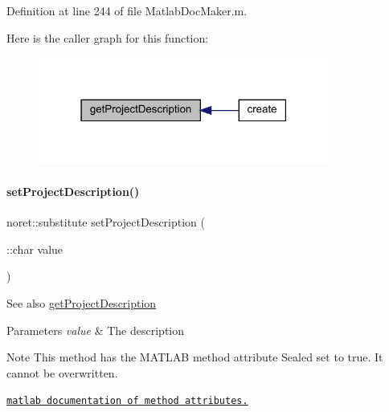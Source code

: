 Definition at line 244 of file Matlab\+Doc\+Maker.\+m.

Here is the caller graph for this function\+:\nopagebreak
\begin{figure}[H]
\begin{center}
\leavevmode
\includegraphics[width=271pt]{class_matlab_doc_maker_add46ecca31bbef99fba8ba6dc177e05a_icgraph}
\end{center}
\end{figure}
\mbox{\label{class_matlab_doc_maker_aa36d079ff377b0de42dd58c0154abc0d}} 
\paragraph{\texorpdfstring{set\+Project\+Description()}{setProjectDescription()}}
{\footnotesize\ttfamily noret\+::substitute set\+Project\+Description (\begin{DoxyParamCaption}\item[{\+::char}]{value }\end{DoxyParamCaption})\hspace{0.3cm}{\ttfamily [static]}}

\begin{DoxySeeAlso}{See also}
\hyperlink{class_matlab_doc_maker_add46ecca31bbef99fba8ba6dc177e05a}{get\+Project\+Description}
\end{DoxySeeAlso}

\begin{DoxyParams}{Parameters}
{\em value} & The description\\
\hline
\end{DoxyParams}
\begin{DoxyNote}{Note}
This method has the M\+A\+T\+L\+AB method attribute {\ttfamily Sealed} set to true. It cannot be overwritten. 

\href{http://www.mathworks.com/help/matlab/matlab_oop/method-attributes.html}{\tt matlab documentation of method attributes.} 
\end{DoxyNote}


